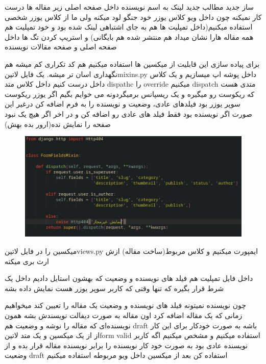 \documentclass{article}
\begin{document}
	‌ساز
	‌جدید
	‌مطالب
	‌جدید
		لینک به اسم نویسنده داخل صفحه اصلی زیر مقاله ها درست کار نمیکنه چون داخل ویو کلاس یوزر خود جنگو لود میکنه ولی ما از 
		کلاس یوزر شخصی استفاده میکنیم(داخل تمپلیت ها هم به جای اشتباهی لینک شده بود و خود تمپلیت هم همه مقاله هارا نشان میداد هم 
		منتشر شده هم بایگانی) و استریپ کردن تگ ها داخل صفحه اصلی و صفحه مقالات نویسنده

		برای پیاده سازی این قابلیت از میکسین ها استفاده میکنیم هم کد تکراری کم میشه هم نگهداری اسان تر میشه.
		یک فایل ‌لاتین{mixins.py} داخل پوشه اپ میسازیم و یک کلاس داخل درست کنیم داخل کلاس متد dispathc را override
		 میکنیم dispatch متدی هست که ریکوست رو میگیره و یک ریسپانس برمیگردونه می خوایم بگیم اگر یوزر ریکوست سوپر یوزر بود
		 فیلدهای عادی، وضعیت و نویسنده را به فرم اضافه کن درغیر این صورت اگر نویسنده بود فقط فیلد های عادی رو اضافه کن و
		 در اخر اگر هیچ یک نبود صفحه را نمایش نده(ارور بده بهش)
		 \begin{figure}[h!]
		 	\includegraphics[width=\linewidth]{mehran-tarif-course-code-pic/FormFieldMixinPic.jpg}
		 \end{figure}
		 میکسین را در فایل ‌لاتین{views.py} ایمپورت میکنیم و کلاس مربوط(ساخت مقاله) ازش ارث بری میکنه
		 
		 داخل فایل تمپلیت هم فیلد های نویسنده و وضعیت که بهشون استایل دادیم داخل یک شرط قرار بگیره که تنها وقتی که کاربر
		 سوپر یوزر هست نمایش داده بشه
	
			چون نویسنده نمیتونه فیلد های نویسنده و وضعیت یک مقاله را تعیین کند میخواهیم زمانی که یک مقاله اضافه کرد اون مقاله
			به صورت دیفالت نویسندش بشه همون نویسنده‌ای که مقاله را نوشه و وضعیت هم draft باشه به صورت خودکار برای این کار از
			از یک میکسین و یک متد ‌لاتین{form valid} استفاده میکنیم و مشخص میکنیم اگه کاربر نویسنده عادی بود به صورت خود 
			کار نویسنده را برابر نویسنده مقاله قرار بده و از وضعیت draft استفاده کن بعد از میکسین داخل ویو مربوطه استفاده 
			میکنیم 
			
\end{document}
